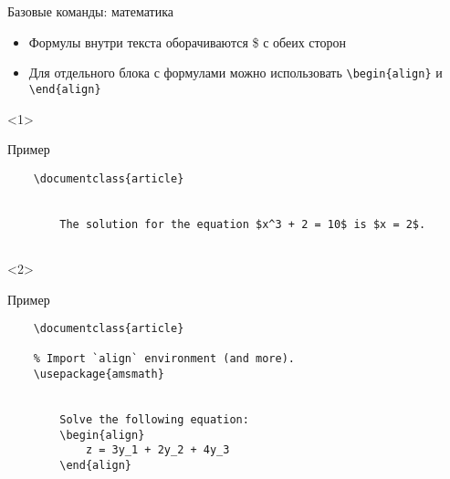 
\begin{frame}[fragile]{Базовые команды: математика}

\begin{itemize}[<+->]
    \item Формулы внутри текста оборачиваются \$ с обеих сторон
    \item Для отдельного блока с формулами можно использовать \lstinline!\begin{align}! и \lstinline!\end{align}!
\end{itemize}

\begin{onlyenv}<1>
    \begin{block}{Пример}
        \begin{lstlisting}
    \documentclass{article}
    
    
        The solution for the equation $x^3 + 2 = 10$ is $x = 2$.
    
        \end{lstlisting}
    \end{block}
\end{onlyenv}

\begin{onlyenv}<2>
    \begin{block}{Пример}
        \begin{lstlisting}
    \documentclass{article}
    
    % Import `align` environment (and more).
    \usepackage{amsmath}
    
    
        Solve the following equation:
        \begin{align}
            z = 3y_1 + 2y_2 + 4y_3
        \end{align}
    
        \end{lstlisting}
    \end{block}
\end{onlyenv}

\end{frame}


